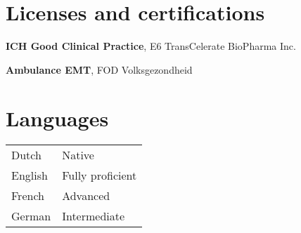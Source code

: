\documentclass[10pt,a4paper]{article}
\begin{document}
\section*{Licenses and certifications}

\textbf{ICH Good Clinical Practice}, E6 TransCelerate BioPharma Inc.
\smallskip

\textbf{Ambulance EMT}, FOD Volksgezondheid \\

\section*{Languages}
\begin{tabularx}{\linewidth}{@{}p{1.2in} X@{}}
	Dutch   & Native           \\
	English & Fully proficient \\
	French  & Advanced         \\
	German  & Intermediate     \\
\end{tabularx}
\end{document}
